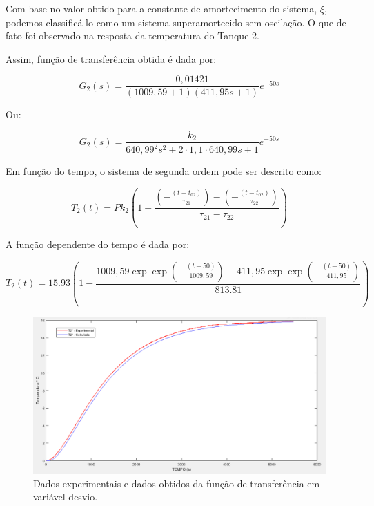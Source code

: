 Com base no valor obtido para a constante de amortecimento do sistema, $ \xi $, podemos classificá-lo como um sistema superamortecido sem oscilação. O que de fato foi observado na resposta da temperatura do Tanque 2.

\newpage

Assim, função de transferência obtida é dada por:

\begin{equation}\label{key}
G_{2}(s)=\frac{0,01421}{(1009,59+1)(411,95 s+1)} e^{-50 s}
\end{equation}

Ou: 

\begin{equation}\label{key}
G_{2}(s)=\frac{k_{2}}{640,99^{2} s^{2}+2 \cdot 1,1 \cdot 640,99 s+1} e^{-50 s}
\end{equation}

Em função do tempo, o sistema de segunda ordem pode ser descrito como:

\begin{equation}\label{key}
T_{2}(t)=P k_{2}\left(1-\frac{\left(-\frac{\left(t-t_{02}\right)}{\tau_{21}}\right)-\left(-\frac{\left(t-t_{02}\right)}{\tau_{22}}\right)}{\tau_{21}-\tau_{22}}\right)
\end{equation}


A função dependente do tempo é dada por:


\begin{equation}\label{key}
T_{2}(t)=15.93\left(1-\frac{1009,59 \exp \exp \left(-\frac{(t-50)}{1009,59}\right)-411,95 \exp \exp \left(-\frac{(t-50)}{411,95}\right)}{813.81}\right)
\end{equation}


\begin{figure}[H]
	\begin{center}
		\includegraphics[scale=.5, trim={0 0 0 0}]{figuras/ladeq/dina/graph2}
		\caption{Dados experimentais e dados obtidos da função de transferência em variável desvio.}
		\label{iFix}
	\end{center}
\end{figure}

